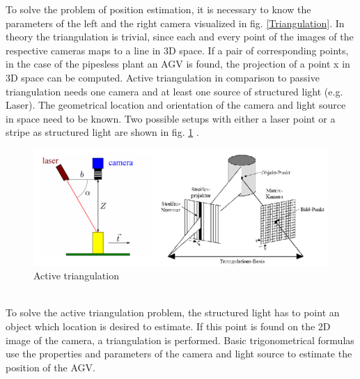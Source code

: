\newpage To solve the problem of position estimation, it is necessary to know the parameters of the left and the right camera visualized in fig. \ref{Triangulation}. In theory the triangulation is trivial, since each and every point of the images of the respective cameras maps to a line in 3D space. If a pair of corresponding points, in the case of the pipesless plant an AGV is found, the projection of a point x in 3D space can be computed. 
Active triangulation in comparison to passive triangulation needs one camera and at least one source of structured light (e.g. Laser). The geometrical location and orientation of the camera and light source in space need to be known. Two possible setups with either a laser point or a stripe as structured light are shown in fig. \ref{ative_Triangulation} \cite{MultiObjectTriangulation.}\cite{laser_triangulation}.\\
\begin{figure}[!htbp]
\begin{center}
\centering
\includegraphics[width = 16cm]{Pictures/acticetriangulation}
\caption[The ListOfFigures caption]{Active triangulation \footnotemark[2]}
\label{ative_Triangulation}
\end{center}
\end{figure}
\\To solve the active triangulation problem, the structured light has to point an object which location is desired to estimate. If this point is found on the 2D image of the camera, a triangulation is performed. Basic trigonometrical formulas \cite{TriangulationFormula} use the properties and parameters of the camera and light source to estimate the position of the AGV.\\
\pagebreak
